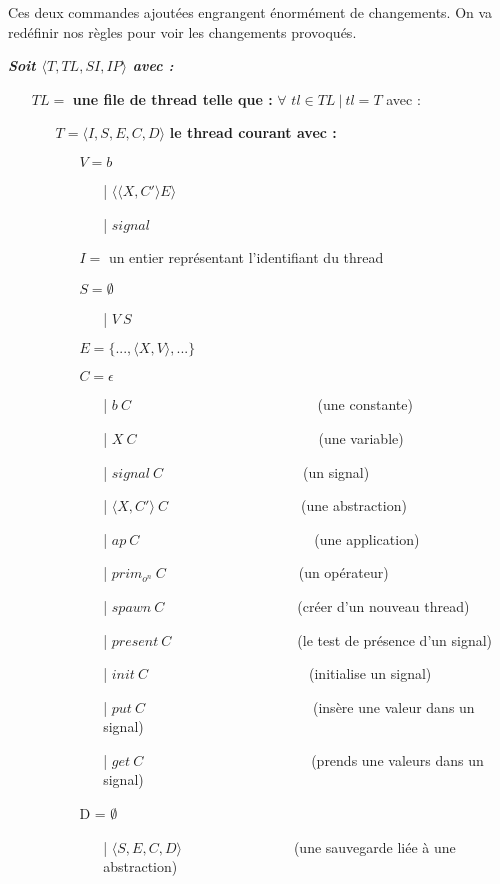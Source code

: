 \documentclass[10pt,a4paper]{report}
\begin{document}
Ces deux commandes ajoutées engrangent énormément de changements. On va redéfinir nos règles pour voir les changements provoqués. 
\bigbreak

\textbf{\textit{Soit $\langle T,TL,SI,IP\rangle$ avec :}}

\begin{itemize}
\item[] $TL =$ \textbf{une file de thread telle que :} $\forall$ $tl \in TL~|~tl = T$ avec :
  \begin{itemize}
  \item[] $T = \langle I,S,E,C,D\rangle$ \textbf{le thread courant avec :}
    \begin{itemize}
    \item[] $V = b$	
      \begin{itemize}
      \item[|] $\langle\langle X,C' \rangle E\rangle$
      \item[|] $signal$
      \end{itemize}
    \item[] $I =$ un entier représentant l'identifiant du thread
    \item[] $S =  \emptyset$ 
      \begin{itemize}
      \item[|] $V~S$
      \end{itemize}
    \item[] $E = \{...,\langle X,V\rangle,...\}$
    \item[] $C = \epsilon$
      \begin{itemize}
      \item[|] $b~C$~~~~~~~~~~~~~~~~~~~~~~~~~~    (une constante)
      \item[|] $X~C$~~~~~~~~~~~~~~~~~~~~~~~~~~(une variable)
      \item[|] $signal~C$~~~~~~~~~~~~~~~~~~~~(un signal)
      \item[|] $\langle X,C'\rangle~C$~~~~~~~~~~~~~~~~~~~(une abstraction)
      \item[|] $ap~C$~~~~~~~~~~~~~~~~~~~~~~~~~(une application)
      \item[|] $prim_{o^{n}}~C$~~~~~~~~~~~~~~~~~~~(un opérateur)
      \item[|] $spawn~C$~~~~~~~~~~~~~~~~~~~(créer d'un nouveau thread)
      \item[|] $present~C$~~~~~~~~~~~~~~~~~~(le test de présence d'un signal)
      \item[|] $init~C$~~~~~~~~~~~~~~~~~~~~~~~(initialise un signal)
      \item[|] $put~C$~~~~~~~~~~~~~~~~~~~~~~~~(insère une valeur dans un signal)
      \item[|] $get~C$~~~~~~~~~~~~~~~~~~~~~~~~(prends une valeurs dans un signal)
      \end{itemize}
    \item[] D = $\emptyset$
      \begin{itemize}
      \item[|] $\langle S,E,C,D\rangle$~~~~~~~~~~~~~~~~(une sauvegarde liée à une abstraction)
      \end{itemize}
    \end{itemize}	
  \end{itemize}
  

\end{itemize}
\end{document}
